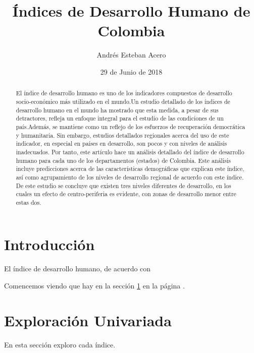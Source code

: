 \documentclass{article}
\title{Índices de Desarrollo Humano de Colombia}
\author[1]{\normalsize Andrés Esteban Acero}
\affil[1]{\small  Doctorado en Ingeniería Industrial, Facultad de Ingeniería,Universidad de los Andes\\
\texttt{{ae.acero539@uniandes.edu.col}}}
\date{29 de Junio de 2018}
\begin{document}


\maketitle

\begin{abstract}
El índice de desarrollo humano es uno de los indicadores compuestos de desarrollo socio-económico más utilizado en el mundo.Un estudio detallado de los índices de desarrollo humano en el mundo ha mostrado que esta medida, a pesar de sus detractores, refleja un enfoque integral para el estudio de las condiciones de un país.Además, se mantiene como un reflejo de los esfuerzos de recuperación democrática y humanitaria.  Sin embargo, estudios detallados regionales acerca del uso de este indicador, en especial en países en desarrollo, son pocos y con niveles de análisis inadecuados. Por tanto, este artículo hace un análisis detallado del índice de desarrollo humano para cada uno de los departamentos (estados) de Colombia. Este análisis incluye predicciones acerca de las características demográficas que explican este índice, así como agrupamiento de los niveles de desarrollo regional de acuerdo con este índice. De este estudio se concluye que existen tres niveles diferentes de desarrollo, en los cuales un efecto de centro-periferia es evidente, con zonas de desarrollo menor entre estas dos.
\end{abstract}

\section*{Introducción}
El índice de desarrollo humano, de acuerdo con \cite{sales_proposal_2018}

Comencemos viendo que hay en la sección \ref{univariada} en la página \pageref{univariada}.
\clearpage

\section{Exploración Univariada}\label{univariada}
En esta sección exploro cada índice.
\end{document}
